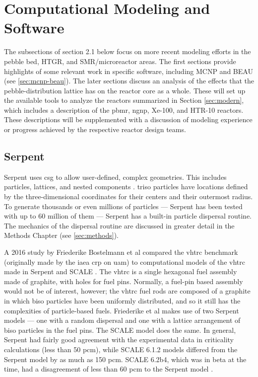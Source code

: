 
\section{Computational Modeling and Software}

The subsections of section 2.1 below focus on more recent modeling efforts in the pebble bed, HTGR, and SMR/microreactor areas.  The first sections provide highlights of some relevant work in specific software, including MCNP and BEAU \cite{cisneros_pebble_2013} (see \autoref{sec:mcnp-beau}).  The later sections discuss an analysis of the effects that the pebble-distribution lattice has on the reactor core as a whole.  These will set up the available tools to analyze the reactors summarized in Section \autoref{sec:modern}, which includes a description of the \acrfull{pbmr}, \acrfull{ngnp}, Xe-100, and HTR-10 reactors.  These descriptions will be supplemented with a discussion of modeling experience or progress achieved by the respective reactor design teams.

\subsection{Serpent}

Serpent uses \acrfull{csg} to allow user-defined, complex geometries.  This includes particles, lattices, and nested components \cite{noauthor_serpent_nodate}.  \acrshort{triso} particles have locations defined by the three-dimensional coordinates for their centers and their outermost radius. To generate thousands or even millions of particles --- Serpent has been tested with up to 60 million of them \cite{noauthor_serpent_nodate} --- Serpent has a built-in particle dispersal routine.  The mechanics of the dispersal routine are discussed in greater detail in the Methods Chapter (see \autoref{sec:methods}).

A 2016 study by Friederike Bostelmann et al compared the \acrfull{vhtrc} \cite{oecd_irphe_2019} benchmark (originally made by the \acrfull{iaea} \acrfull{crp} on \acrfull{uam}) to computational models of the \acrshort{vhtrc} made in Serpent and SCALE \cite{bostelmann_criticality_2016}.  The \acrshort{vhtrc} is a single hexagonal fuel assembly made of graphite, with holes for fuel pins.  Normally, a fuel-pin based assembly would not be of interest, however; the \acrshort{vhtrc} fuel rods are composed of a graphite in which \acrshort{biso} particles have been uniformly distributed, and so it still has the complexities of particle-based fuels.  Friederike et al makes use of two Serpent models --- one with a random dispersal and one with a lattice arrangement of \acrshort{biso} particles in the fuel pins.  The SCALE model does the same.  In general, Serpent had fairly good agreement with the experimental data in criticality calculations (less than 50 pcm), while SCALE 6.1.2 models differed from the Serpent model by as much as 150 pcm.  SCALE 6.2b4, which was in beta at the time, had a disagreement of less than 60 pcm to the Serpent model \cite{bostelmann_criticality_2016}.

